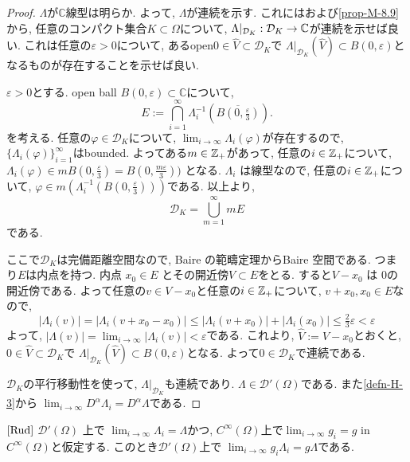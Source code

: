 \begin{proof}
$\Lambda$が$\mathbb{C}$線型は明らか. 
よって, $\Lambda$が連続を示す. 
これには\cite[Thm 6.6]{Rud}および\ref{prop-M-8.9}から, 
任意のコンパクト集合$K \subset \Omega$について, $\Lambda|_{\mathcal{D}_K} : \mathcal{D}_K \to \mathbb{C}$が連続を示せば良い. 
これは任意の$\varepsilon >0$について, あるopen$0 \in \widehat{V} \subset \mathcal{D}_K $で
$\Lambda|_{\mathcal{D}_K} (\widehat{V})  \subset B(0, \varepsilon) $となるものが存在することを示せば良い. 

$\varepsilon >0$とする. 
open ball $B(0,\varepsilon) \subset \mathbb{C}$について, 
\[
E := \bigcap_{i=1}^\infty \Lambda_i^{-1}(
\overline{B(0,\tfrac{\varepsilon}{3})}).
\]
を考える. 
任意の$\varphi \in \mathcal{D}_K$について, 
$\lim_{i \to \infty} \Lambda_i(\varphi)$が存在するので, 
$\{\Lambda_i(\varphi)\}_{i=1}^\infty$はbounded.
よってある$m \in \mathbb{Z}_+$があって, 任意の$i \in \mathbb{Z}_+$について, 
$\Lambda_i(\varphi) \in m B(0, \tfrac{\varepsilon}{3})=B(0,\tfrac{m \varepsilon}{3}))$ となる.
$\Lambda_i$ は線型なので, 任意の$i \in \mathbb{Z}_+$について,
$\varphi \in m (\Lambda_i^{-1}(B(0,\tfrac{\varepsilon}{3})))$である. 
以上より, 
$$
\mathcal{D}_K = \bigcup_{m=1}^\infty m E
$$
である. 

ここで$\mathcal{D}_K$は完備距離空間なので, Baire の範疇定理からBaire 空間である. 
つまり$E$は内点を持つ.
内点 $x_0 \in E$ とその開近傍$V \subset E$をとる. 
すると$ V - x_0$ は $0$の開近傍である. 
よって任意の$v \in V - x_0$と任意の$i \in \mathbb{Z}_+$について, 
$v+x_0, x_0 \in E$なので, 
\[
|\Lambda_i(v)| 
= |\Lambda_i(v+x_0 - x_0)| 
\le |\Lambda_i(v+x_0)| + |\Lambda_i(x_0)| 
\le \tfrac{2}{3} \varepsilon
<\varepsilon
\]
よって, $|\Lambda(v)| = \lim_{i \to \infty} |\Lambda_i(v)| < \varepsilon$である. 
これより, $\widehat{V} := V - x_0$とおくと,  
$0 \in \widehat{V} \subset \mathcal{D}_K $で
$\Lambda|_{\mathcal{D}_K} (\widehat{V})  \subset B(0, \varepsilon)$となる. 
よって$0 \in \mathcal{D}_K$で連続である. 

$\mathcal{D}_K$の平行移動性を使って, 
$\Lambda|_{\mathcal{D}_K}$も連続であり. $\Lambda \in \mathcal{D}'(\Omega)$である. 
また\ref{defn-H-3}から
\(
\lim_{i \to \infty} D^\alpha \Lambda_i = D^\alpha \Lambda
\)である. 
\end{proof}

\begin{tcolorbox}[mybox]
\begin{thm}{$\cite[Thm 6.18]{Rud}$}
\label{thm-H-17}
$\mathcal{D}'(\Omega)$ 上で
$\lim_{i \to \infty} \Lambda_i = \Lambda$かつ, 
$C^\infty(\Omega)$上で$\lim_{i \to \infty} g_i = g$ in $C^\infty(\Omega)$と仮定する.
このとき$\mathcal{D}'(\Omega)$上で
\(
\lim_{i \to \infty} g_i \Lambda_i = g \Lambda
\)である. 
\end{thm}
\end{tcolorbox}

